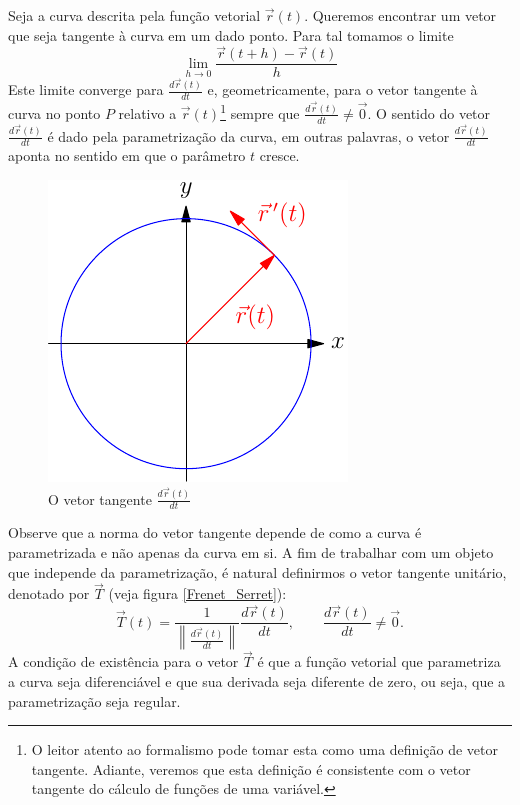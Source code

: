 Seja a curva descrita pela função vetorial $\vec{r}(t)$. Queremos encontrar um vetor que seja tangente à curva em um dado ponto. Para tal tomamos o limite
$$\lim_{h\to 0} \frac{\vec{r}(t+h)-\vec{r}(t)}{h}$$  
Este limite converge para $\frac{d\vec{r}(t)}{dt}$ e, geometricamente, para o vetor tangente à curva no ponto $P$ relativo a $\vec{r}(t)$\footnote{O leitor atento ao formalismo pode tomar esta como uma definição de vetor tangente. Adiante, veremos que esta definição é consistente com o vetor tangente do cálculo de funções de uma variável.} sempre que $\frac{d\vec{r}(t)}{dt} \neq \vec{0}$. O sentido do vetor $\frac{d\vec{r}(t)}{dt}$ é dado pela parametrização da curva, em outras palavras, o vetor $\frac{d\vec{r}(t)}{dt}$ aponta no sentido em que o parâmetro $t$ cresce.


\begin{figure}%
\begin{center}
    \includegraphics{./cap_curvas/figs/vetor_tangente_circunferencia}
\caption{O vetor tangente $\frac{d\vec{r}(t)}{dt}$}\label{circtang}
  \end{center}
\end{figure}


Observe que a norma do vetor tangente depende de como a curva é parametrizada e não apenas da curva em si. A fim de trabalhar com um objeto que independe da parametrização, é natural definirmos o vetor tangente unitário, denotado por $\vec{T}$ (veja figura \ref{Frenet_Serret}):
\begin{equation}\label{defvecunit}
\vec{T}(t)=\frac{1}{\left\|\frac{d\vec{r}(t)}{dt}\right\|}\frac{d\vec{r}(t)}{dt},\qquad \frac{d\vec{r}(t)}{dt} \neq \vec{0}.
\end{equation} 
A condição de existência para o vetor $\vec{T}$ é que a função vetorial que parametriza a curva seja diferenciável e que sua derivada seja diferente de zero, ou seja, que a parametrização seja regular.

